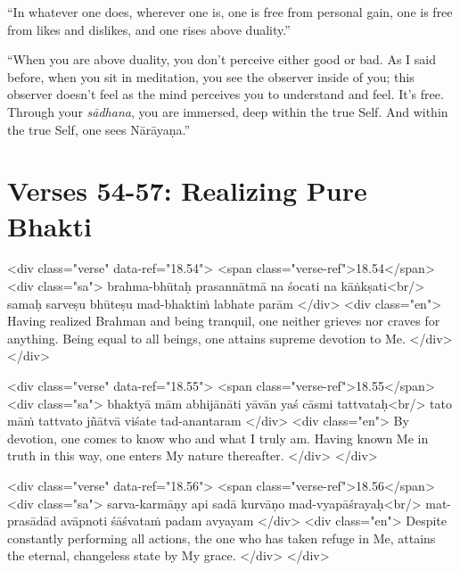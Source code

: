 \enquote{In whatever one does, wherever one is, one is free from personal gain, one is free from likes and dislikes, and one rises above duality.}

\enquote{When you are above duality, you don’t perceive either good or bad. As I said before, when you sit in meditation, you see the observer inside of you; this observer doesn’t feel as the mind perceives you to understand and feel. It’s free. Through your \textit{sādhana}, you are immersed, deep within the true Self. And within the true Self, one sees Nārāyaṇa.}

\section{Verses 54-57: Realizing Pure Bhakti}\label{sec-verses-54-57-realizing-pure-bhakti}


\begin{html}
<div class="verse" data-ref="18.54">
  <span class="verse-ref">18.54</span>
  <div class="sa">
    brahma-bhūtaḥ prasannātmā na śocati na kāṅkṣati<br/>
    samaḥ sarveṣu bhūteṣu mad-bhaktiṁ labhate parām
  </div>
  <div class="en">
    Having realized Brahman and being tranquil, one neither grieves nor craves for anything. Being equal to all beings, one attains supreme devotion to Me.
  </div>
</div>
\end{html}



\begin{html}
<div class="verse" data-ref="18.55">
  <span class="verse-ref">18.55</span>
  <div class="sa">
    bhaktyā mām abhijānāti yāvān yaś cāsmi tattvataḥ<br/>
    tato māṁ tattvato jñātvā viśate tad-anantaram
  </div>
  <div class="en">
    By devotion, one comes to know who and what I truly am. Having known Me in truth in this way, one enters My nature thereafter.
  </div>
</div>
\end{html}



\begin{html}
<div class="verse" data-ref="18.56">
  <span class="verse-ref">18.56</span>
  <div class="sa">
    sarva-karmāṇy api sadā kurvāṇo mad-vyapāśrayaḥ<br/>
    mat-prasādād avāpnoti śāśvataṁ padam avyayam
  </div>
  <div class="en">
    Despite constantly performing all actions, the one who has taken refuge in Me, attains the eternal, changeless state by My grace.
  </div>
</div>
\end{html}



